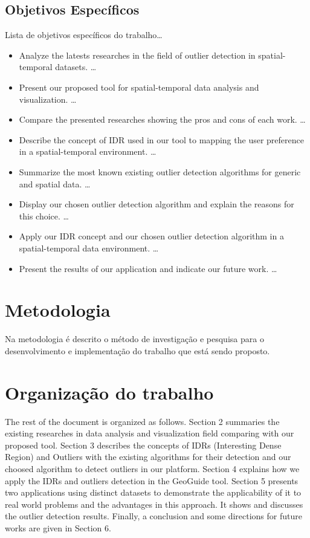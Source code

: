 \subsection{Objetivos Específicos} 

Lista de objetivos específicos do trabalho\ldots

\begin{itemize}
  \item
    Analyze the latests researches in the field of outlier detection in spatial-temporal
    datasets.
  \ldots
  \item
    Present our proposed tool for spatial-temporal data analysis and visualization. 
  \ldots
  \item
    Compare the presented researches showing the pros and cons of each work.
  \ldots
  \item
    Describe the concept of IDR used in our tool to mapping the user preference in a
    spatial-temporal environment.
  \ldots
  \item
    Summarize the most known existing outlier detection algorithms for generic and spatial
    data.
  \ldots
  \item
    Display our chosen outlier detection algorithm and explain the reasons for this choice.
  \ldots
  \item
    Apply our IDR concept and our chosen outlier detection algorithm in a spatial-temporal
    data environment.
  \ldots
  \item
    Present the results of our application and indicate our future work.
  \ldots
  
\end{itemize}

\section{Metodologia}

Na metodologia é descrito o método de investigação e pesquisa para o
desenvolvimento e implementação do trabalho que está sendo proposto.

\section{Organização do trabalho}

The rest of the document is organized as follows. Section 2 summaries the existing
researches in data analysis and visualization field comparing with our proposed tool.
Section 3 describes the concepts of IDRs (Interesting Dense Region) and Outliers with
the existing algorithms for their detection and our choosed algorithm to detect outliers
in our platform. Section 4 explains how we apply the IDRs and outliers detection in the
GeoGuide tool. Section 5 presents two applications using distinct datasets to demonstrate
the applicability of it to real world problems and the advantages in this approach. It
shows and discusses the outlier detection results. Finally, a conclusion and some 
directions for future works are given in Section 6.
